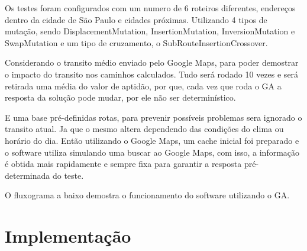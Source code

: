 Os testes foram configurados com um numero de 6 roteiros diferentes, endereços dentro da cidade de São Paulo e cidades próximas. Utilizando 4 tipos de mutação, sendo DisplacementMutation, InsertionMutation, InversionMutation e SwapMutation e um tipo de cruzamento, o SubRouteInsertionCrossover.

Considerando o transito médio enviado pelo Google Maps, para poder demostrar o impacto do transito nos caminhos calculados.
Tudo será rodado 10 vezes e será retirada uma média do valor de aptidão, por que, cada vez que roda o GA a resposta da solução pode mudar, por ele não ser determinístico.

E uma base pré-definidas rotas, para prevenir possíveis problemas sera ignorado o transito atual. Ja que o mesmo altera dependendo das condições do clima ou horário do dia. Então utilizando o Google Maps, um cache inicial foi preparado e o software utiliza simulando uma buscar ao Google Maps, com isso, a informação é obtida mais rapidamente e sempre fixa para garantir a resposta pré-determinada do teste.

O fluxograma a baixo demostra o funcionamento do software utilizando o GA.

\begin{center}
	\label{fig:FluxoGA}
\end{center}

\chapter{Implementação}
 
